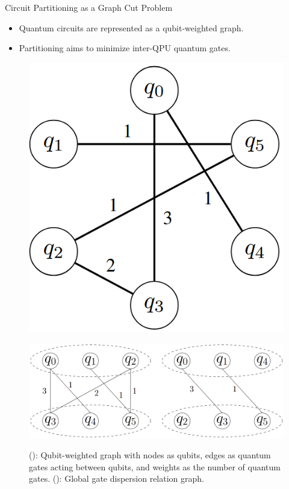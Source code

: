 \documentclass{beamer}
\begin{document}
	\begin{frame}{Circuit Partitioning as a Graph Cut Problem}
		\begin{itemize}
			\item Quantum circuits are represented as a qubit-weighted graph.
			\item Partitioning aims to minimize inter-QPU quantum gates.
		\end{itemize}
		\begin{figure}
			\begin{minipage}{.3\textwidth}
				\includegraphics[width=.8\textwidth]{figure/edge.png}
				
				\subcaption{}
				\label{fig:edge}
			\end{minipage}
			\begin{minipage}{.65\textwidth}
				\includegraphics[width=.8\textwidth]{figure/cut.png}
				
				\subcaption{}
				\label{fig:cut}
			\end{minipage}
			\caption[]{(): Qubit-weighted graph with nodes as qubits, edges as quantum gates acting between qubits, and weights as the number of quantum gates. (): Global gate dispersion relation graph.}
		\end{figure}
	\end{frame}
	
\end{document}
